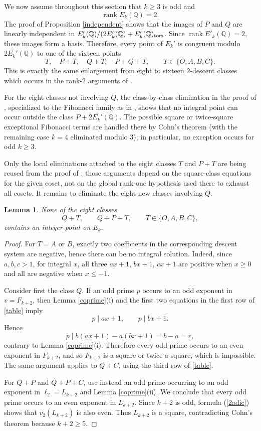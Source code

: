 \documentclass[11pt]{amsart}
\newtheorem{lemma}[theorem]{Lemma}
\theoremstyle{remark}
\newcommand{\Q}{\mathbb{Q}}
\begin{document}
We now assume throughout this section that $k\geq3$ is odd and
\[
 \operatorname{rank}E_k(\Q)=2.
\]
The proof of Proposition \ref{independent} shows that the images of $P$ and $Q$ 
are linearly independent in $E_k'(\Q)/(2E_k'(\Q) + E_k'(\Q)_{\rm tors}$. 
Since $\operatorname{rank}E'_k(\Q)= 2$, these images form a basis. Therefore, every point of
$E_k'$ is congruent modulo $2E_k'(\Q)$ to one of the sixteen points
\[
 T,\quad P+T,\quad Q+T,\quad P+Q+T,
 \qquad T\in\{O,A,B,C\}.
\]
This is exactly the same enlargement from eight to sixteen
$2$-descent classes which occurs in the rank-$2$ arguments of
\cite{DujellaPetho,DujellaParam}.

For the eight classes not involving $Q$, the class-by-class
elimination in the proof of \cite[Theorem 4]{DujellaMT}, specialized
to the Fibonacci family as in \cite[Theorem 6]{DujellaMT}, shows that
no integral point can occur outside the class $P+2E_k'(\Q)$.
The possible square or twice-square exceptional Fibonacci terms are
handled there by Cohn's theorem (with the remaining case $k=4$
eliminated modulo $3$); in particular, no exception occurs for odd
$k\geq3$.


Only the local eliminations attached to the eight classes $T$ and $P + T$ are being
reused from the proof of \cite[Theorem 4]{DujellaMT}; those arguments depend on the square-class
equations for the given coset, not on the global rank-one hypothesis used there to
exhaust all cosets.  
It remains to eliminate the eight new classes involving $Q$. 

\begin{lemma}\label{nointegerQ}
None of the eight classes
\[
 Q+T,\qquad Q+P+T,\qquad T\in\{O,A,B,C\},
\]
contains an integer point on $E_k$.
\end{lemma}

\begin{proof}
For $T=A$ or $B$, exactly two coefficients in the corresponding
descent system are negative, hence there can be no integral solution. 
Indeed, since $a,b,c>1$, for integral $x$, all three
$ax + 1$, $bx + 1$, $cx + 1$ are positive
when $x \geq 0$ and all are negative
when $x \leq -1$. 

Consider first the class $Q$.  If an odd prime $p$ occurs to an odd
exponent in $v=F_{k+2}$, then Lemma \ref{coprime}(i) and the first two
equations in the first row of \eqref{table} imply
\[
 p\mid ax+1,\qquad p\mid bx+1.
\]
Hence
\[
 p\mid b(ax+1)-a(bx+1)=b-a=r,
\]
contrary to Lemma \ref{coprime}(i).  Therefore every odd prime occurs
to an even exponent in $F_{k+2}$, and so $F_{k+2}$ is a square or
twice a square, which is impossible.  The same argument applies to
$Q+C$, using the third row of \eqref{table}.

For $Q+P$ and $Q+P+C$, use instead an odd prime occurring to an odd
exponent in $\ell_2=L_{k+2}$ and Lemma \ref{coprime}(ii).  
We conclude that every odd prime occurs to an
even exponent in $L_{k+2}$. Since $k + 2$ is odd, formula (\ref{2adic}) shows that 
$v_2(L_{k+2})$ is
also even. Thus $L_{k+2}$ is a square, contradicting Cohn's theorem because $k + 2 \geq 5$.
\end{proof}
\end{document}
